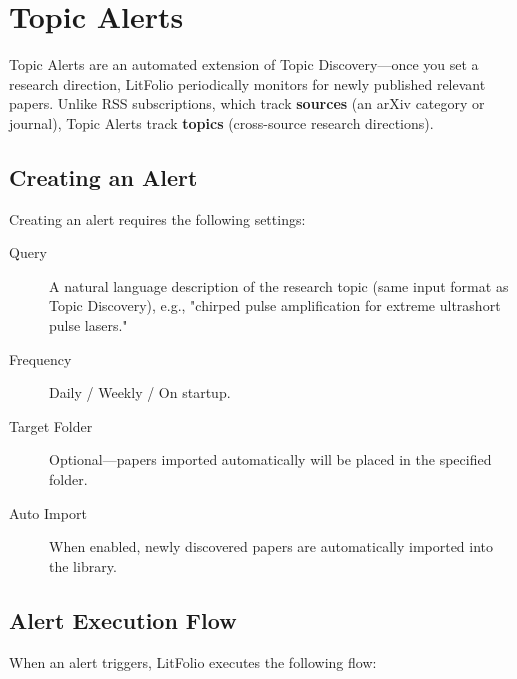 \section{Topic Alerts}

Topic Alerts are an automated extension of Topic Discovery---once you set a research direction,
LitFolio periodically monitors for newly published relevant papers. Unlike RSS subscriptions, which
track \textbf{sources} (an arXiv category or journal), Topic Alerts track \textbf{topics}
(cross-source research directions).


\subsection{Creating an Alert}

Creating an alert requires the following settings:

\begin{description}
  \item[Query] A natural language description of the research topic (same input format as Topic
    Discovery), e.g., "chirped pulse amplification for extreme ultrashort pulse lasers."
  \item[Frequency] Daily / Weekly / On startup.
  \item[Target Folder] Optional---papers imported automatically will be placed in the specified
    folder.
  \item[Auto Import] When enabled, newly discovered papers are automatically imported into the
    library.
\end{description}

\subsection{Alert Execution Flow}

When an alert triggers, LitFolio executes the following flow:

